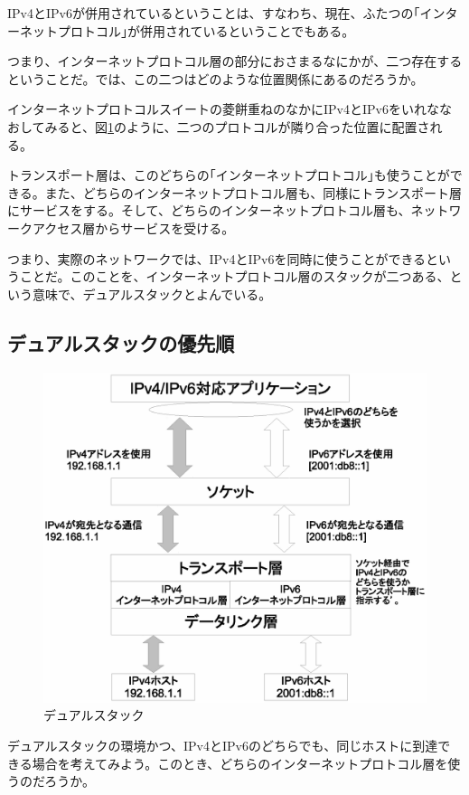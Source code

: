 IPv4とIPv6が併用されているということは、すなわち、現在、ふたつの｢インターネットプロトコル｣が併用されているということでもある。

つまり、インターネットプロトコル層の部分におさまるなにかが、二つ存在するということだ。では、この二つはどのような位置関係にあるのだろうか。

インターネットプロトコルスイートの菱餅重ねのなかにIPv4とIPv6をいれななおしてみると、図\ref{fig:dualstack}のように、二つのプロトコルが隣り合った位置に配置される。

トランスポート層は、このどちらの｢インターネットプロトコル｣も使うことができる。また、どちらのインターネットプロトコル層も、同様にトランスポート層にサービスをする。そして、どちらのインターネットプロトコル層も、ネットワークアクセス層からサービスを受ける。

つまり、実際のネットワークでは、IPv4とIPv6を同時に使うことができるということだ。このことを、インターネットプロトコル層のスタックが二つある、という意味で、デュアルスタックとよんでいる。

\subsection{デュアルスタックの優先順}

\begin{figure}[htbp]
	\includegraphics[width=12cm,clip]{draw/doublebind.eps}
	\caption{デュアルスタック}
	\label{fig:dualstack}
\end{figure}

デュアルスタックの環境かつ、IPv4とIPv6のどちらでも、同じホストに到達できる場合を考えてみよう。このとき、どちらのインターネットプロトコル層を使うのだろうか。

